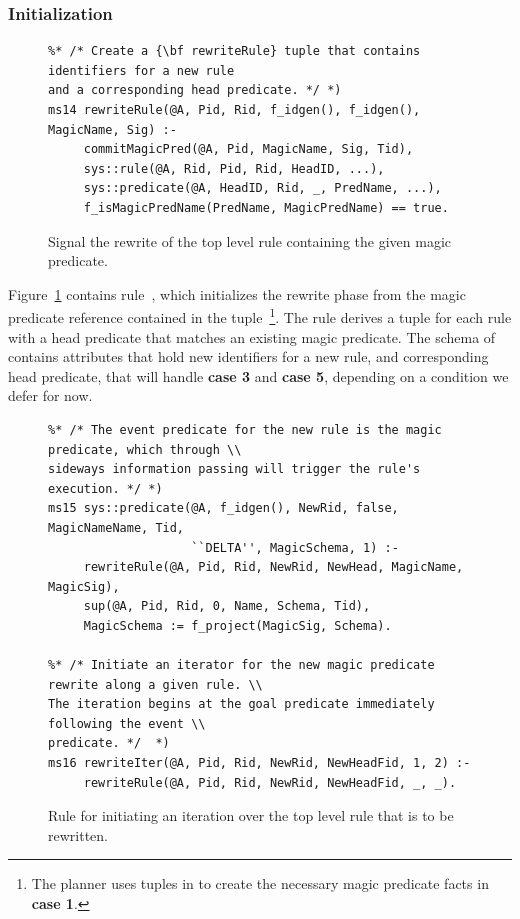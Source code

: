 \subsubsection{Initialization}

\begin{figure}
\ssp
\centering
\begin{lstlisting}
%* /* Create a {\bf rewriteRule} tuple that contains identifiers for a new rule
and a corresponding head predicate. */ *)
ms14 rewriteRule(@A, Pid, Rid, f_idgen(), f_idgen(), MagicName, Sig) :-
     commitMagicPred(@A, Pid, MagicName, Sig, Tid),
     sys::rule(@A, Rid, Pid, Rid, HeadID, ...),
     sys::predicate(@A, HeadID, Rid, _, PredName, ...),
     f_isMagicPredName(PredName, MagicPredName) == true.
\end{lstlisting}
\caption{\label{ch:magic:fig:rewrite1} Signal the rewrite of the top level rule 
containing the given magic predicate.}
\end{figure}

Figure~\ref{ch:magic:fig:rewrite1} contains rule~, which initializes
the rewrite phase from the magic predicate reference contained in the
 tuple~\footnote{The planner uses tuples in
 to create the necessary magic predicate facts in {\bf case
1}.}.  The rule derives a  tuple for each rule with a head
predicate that matches an existing magic predicate.  The schema of
 contains attributes that hold new identifiers for a new
rule, and corresponding head predicate, that will handle {\bf case 3} and
{\bf case 5}, depending on a condition we defer for now.

\begin{figure}
\ssp
\centering
\begin{lstlisting}
%* /* The event predicate for the new rule is the magic predicate, which through \\
sideways information passing will trigger the rule's execution. */ *)
ms15 sys::predicate(@A, f_idgen(), NewRid, false, MagicNameName, Tid, 
                    ``DELTA'', MagicSchema, 1) :-
     rewriteRule(@A, Pid, Rid, NewRid, NewHead, MagicName, MagicSig),
     sup(@A, Pid, Rid, 0, Name, Schema, Tid),
     MagicSchema := f_project(MagicSig, Schema).

%* /* Initiate an iterator for the new magic predicate rewrite along a given rule. \\
The iteration begins at the goal predicate immediately following the event \\
predicate. */  *)
ms16 rewriteIter(@A, Pid, Rid, NewRid, NewHeadFid, 1, 2) :-
     rewriteRule(@A, Pid, Rid, NewRid, NewHeadFid, _, _).

\end{lstlisting}
\caption{\label{ch:magic:fig:rewrite2} Rule for initiating an iteration over the
top level rule that is to be rewritten. }
\end{figure}

